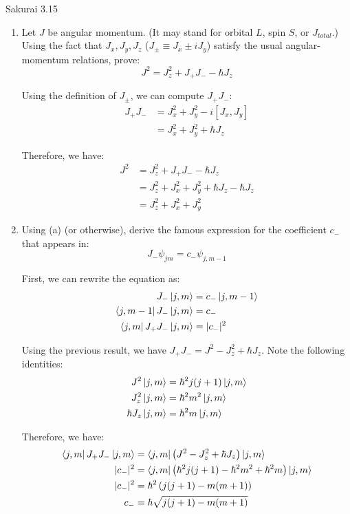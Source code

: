 \documentclass{article}
\begin{document}
\newpage
\begin{section}{Sakurai 3.15}
\begin{enumerate}
	\item Let $J$ be angular momentum. (It may stand for orbital $L$, spin $S$, or $J_{total}$.) Using the fact that $J_x, J_y, J_z$ ($J_\pm \equiv J_x \pm i J_y$) satisfy the usual angular-momentum relations, prove:
	$$
		J^2 = J_z^2 + J_+J_- - \hbar J_z
	$$

	\begin{tcolorbox}
		Using the definition of $J_\pm$, we can compute $J_+J_-$:
		\begin{align*}
			J_+J_- & = J_x^2 + J_y^2 - i [J_x, J_y] \\
			       & = J_x^2 + J_y^2 + \hbar J_z
		\end{align*}

		Therefore, we have:
		\begin{align*}
			J^2 & = J_z^2 + J_+J_- - \hbar J_z                    \\
			    & = J_z^2 + J_x^2 + J_y^2 + \hbar J_z - \hbar J_z \\
			    & = J_z^2 + J_x^2 + J_y^2
		\end{align*}
	\end{tcolorbox}
	\item Using (a) (or otherwise), derive the famous expression for the coefficient $c_-$ that appears in:
	$$
		J_- \psi_{jm}= c_- \psi_{j, m-1}
	$$

	\begin{tcolorbox}
		First, we can rewrite the equation as:
		\begin{align*}
			J_- \ket{j, m}                & = c_- \ket{j, m-1} \\
			\bra{j, m-1} J_- \ket{j, m}   & = c_-              \\
			\bra{j, m} J_+ J_- \ket{j, m} & = |c_-|^2
		\end{align*}

		Using the previous result, we have $J_+J_- = J^2 - J_z^2 + \hbar J_z$. Note the following identities:
		\begin{align*}
			J^2 \ket{j, m}       & = \hbar^2 j (j+1) \ket{j, m} \\
			J_z^2 \ket{j, m}     & = \hbar^2 m^2 \ket{j, m}     \\
			\hbar J_z \ket{j, m} & = \hbar^2 m \ket{j, m}
		\end{align*}

		Therefore, we have:
		\begin{align*}
			\bra{j, m} J_+ J_- \ket{j, m}
			        & = \bra{j, m} \left( J^2 - J_z^2 + \hbar J_z \right) \ket{j, m}                   \\
			|c_-|^2 & = \bra{j, m} \left( \hbar^2 j (j+1) - \hbar^2 m^2 + \hbar^2 m \right) \ket{j, m} \\
			|c_-|^2 & = \hbar^2 \left( j (j+1) - m(m+1) \right)                                        \\
			c_-     & = \hbar \sqrt{j (j+1) - m(m+1)}
		\end{align*}
	\end{tcolorbox}
\end{enumerate}
\end{section}
\end{document}
